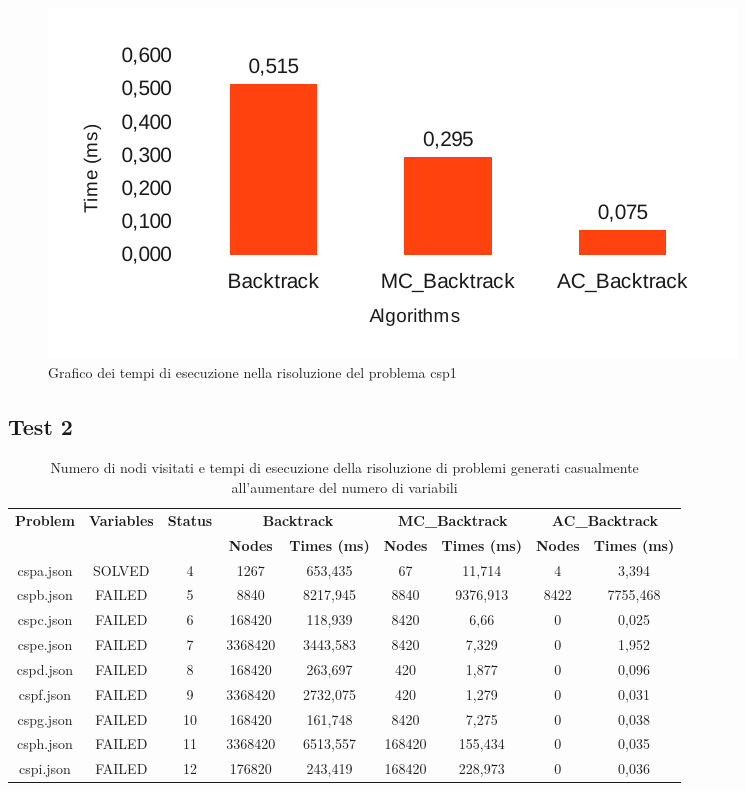 \documentclass[10pt, a4paper]{article}
\begin{document}
\begin{figure}[!h]
\begin{center}
\includegraphics[scale=0.7]{./report-images/test1_time.pdf}
\caption{Grafico dei tempi di esecuzione nella risoluzione del problema csp1}
\label{fig:test1_time}
\end{center}
\end{figure}

\subsection{Test 2}

\begin{table}
\centering
\begin{tabular}{c | c | c | c c | c c | c c}
\textbf{Problem} & \textbf{Variables} & \textbf{Status} & \multicolumn{2}{c}{\textbf{Backtrack}} & \multicolumn{2}{c}{\textbf{MC\_Backtrack}} & \multicolumn{2}{c}{\textbf{AC\_Backtrack}} \\
 & & & \textbf{Nodes} & \textbf{Times (ms)} & \textbf{Nodes} & \textbf{Times (ms)} & \textbf{Nodes} & \textbf{Times (ms)}\\
\toprule
cspa.json & SOLVED & 4 & 1267 & 653,435 & 67 & 11,714 & 4 & 3,394 \\
\midrule
cspb.json & FAILED & 5 & 8840 & 8217,945 & 8840 & 9376,913 & 8422 & 7755,468 \\
\midrule
cspc.json & FAILED & 6 & 168420 & 118,939 & 8420 & 6,66 & 0 & 0,025 \\
\midrule
cspe.json & FAILED & 7 & 3368420	& 3443,583 & 8420 & 7,329 & 0 & 1,952 \\
\midrule
cspd.json & FAILED & 8 & 168420 & 263,697 & 420 & 1,877 & 0 & 0,096 \\
\midrule
cspf.json & FAILED & 9 & 3368420	& 2732,075 & 420 & 1,279 & 0 & 0,031 \\
\midrule
cspg.json & FAILED & 10 & 168420	& 161,748 & 8420 & 7,275 & 0 & 0,038 \\
\midrule
csph.json & FAILED & 11 & 3368420 & 6513,557 & 168420 & 155,434 & 0 & 0,035 \\
\midrule
cspi.json & FAILED & 12 & 176820	& 243,419 & 168420 & 228,973 & 0 & 0,036 \\
\bottomrule
\end{tabular}
\caption{Numero di nodi visitati e tempi di esecuzione della risoluzione di problemi generati casualmente all'aumentare del numero di variabili}
\label{tab:test2}
\end{table}
\end{document}
